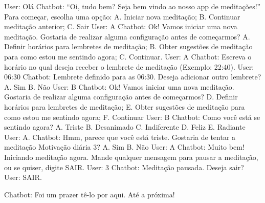 User: Olá
Chatbot: “Oi, tudo bem? Seja bem vindo ao nosso app de meditações!” Para começar,
escolha uma opção:
A. Iniciar nova meditação;
B. Continuar meditação anterior;
C. Sair
User: A
Chatbot: Ok! Vamos iniciar uma nova meditação. Gostaria de realizar alguma configuração
antes de começarmos?
A. Definir horários para lembretes de meditação;
B. Obter sugestões de meditação para como estou me sentindo agora;
C. Continuar.
User: A
Chatbot: Escreva o horário no qual deseja receber o lembrete de meditação (Exemplo:
22:40).
User: 06:30
Chatbot: Lembrete definido para as 06:30. Deseja adicionar outro lembrete?
A. Sim
B. Não
User: B
Chatbot: Ok! Vamos iniciar uma nova meditação. Gostaria de realizar alguma configuração
antes de começarmos?
D. Definir horários para lembretes de meditação;
E. Obter sugestões de meditação para como estou me sentindo agora;
F. Continuar
User: B
Chatbot: Como você está se sentindo agora?
A. Triste
B. Desanimado
C. Indiferente
D. Feliz
E. Radiante
User: A.
Chatbot: Hmm, parece que você está triste. Gostaria de tentar a meditação Motivação
diária 3?
A. Sim
B. Não
User: A
Chatbot: Muito bem! Iniciando meditação agora. Mande qualquer mensagem para pausar a
meditação, ou se quiser, digite SAIR.
User: 3
Chatbot: Meditação pausada. Deseja sair?
User: SAIR.

Chatbot: Foi um prazer tê-lo por aqui. Até a próxima!